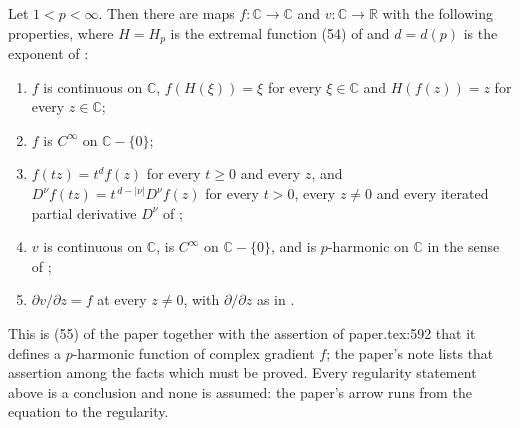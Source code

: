 \begin{theorem}
Let $1<p<\infty$.  Then there are maps $f\colon\mathbb{C}\to\mathbb{C}$ and
$v\colon\mathbb{C}\to\mathbb{R}$ with the following properties, where
$H=H_p$ is the extremal function (54) of  and
$d=d(p)$ is the exponent of :
\begin{enumerate}
\item[(a)] $f$ is continuous on $\mathbb{C}$, $f(H(\xi))=\xi$ for every
  $\xi\in\mathbb{C}$ and $H(f(z))=z$ for every $z\in\mathbb{C}$;
\item[(b)] $f$ is $C^\infty$ on $\mathbb{C}-\{0\}$;
\item[(c)] $f(tz)=t^{d}f(z)$ for every $t\ge0$ and every $z$, and
  $D^\nu f(tz)=t^{\,d-|\nu|}D^\nu f(z)$ for every $t>0$, every $z\neq0$ and
  every iterated partial derivative $D^\nu$ of ;
\item[(d)] $v$ is continuous on $\mathbb{C}$, is $C^\infty$ on
  $\mathbb{C}-\{0\}$, and is $p$-harmonic on $\mathbb{C}$ in the sense of
  ;
\item[(e)] $\partial v/\partial z=f$ at every $z\neq0$, with
  $\partial/\partial z$ as in .
\end{enumerate}

This is (55) of the paper together with the assertion of paper.tex:592 that it
defines a $p$-harmonic function of complex gradient $f$; the paper's note lists
that assertion among the facts which must be proved.  Every regularity
statement above is a conclusion and none is assumed: the paper's arrow runs
from the equation to the regularity.
\end{theorem}
